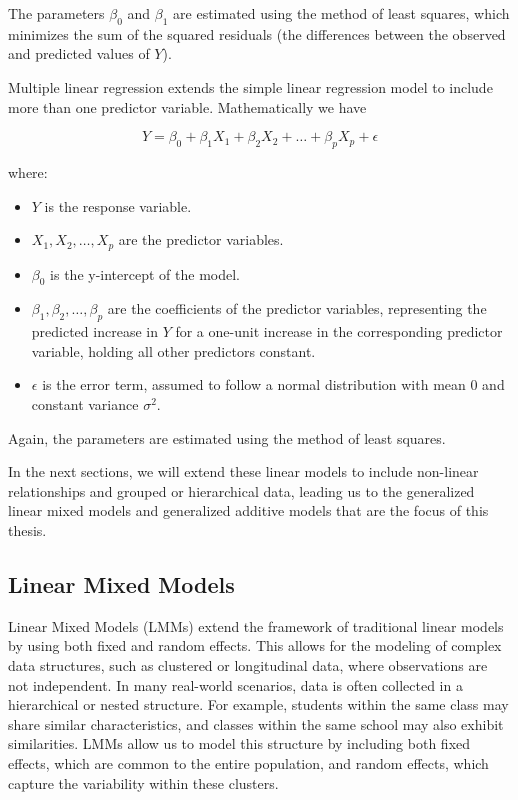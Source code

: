 \documentclass[12pt, twoside,hidelinks]{article}
\theoremstyle{definition}
\numberwithin{equation}{section}
\begin{document}
The parameters \(\beta_0\) and \(\beta_1\) are estimated using the method of least squares, which minimizes the sum of the squared residuals (the differences between the observed and predicted values of \(Y\)).
\newline

Multiple linear regression extends the simple linear regression model to include more than one predictor variable. Mathematically we have

\[ Y = \beta_0 + \beta_1X_1 + \beta_2X_2 + \ldots + \beta_pX_p + \epsilon \]

where:

\begin{itemize}
\item \(Y\) is the response variable.
\item \(X_1, X_2, \ldots, X_p\) are the predictor variables.
\item \(\beta_0\) is the y-intercept of the model.
\item \(\beta_1, \beta_2, \ldots, \beta_p\) are the coefficients of the predictor variables, representing the predicted increase in \(Y\) for a one-unit increase in the corresponding predictor variable, holding all other predictors constant.
\item \(\epsilon\) is the error term, assumed to follow a normal distribution with mean 0 and constant variance \(\sigma^2\).
\end{itemize}

Again, the parameters are estimated using the method of least squares.

In the next sections, we will extend these linear models to include non-linear relationships and grouped or hierarchical data, leading us to the generalized linear mixed models and generalized additive models that are the focus of this thesis.

\subsection{Linear Mixed Models}
Linear Mixed Models (LMMs) extend the framework of traditional linear models by using both fixed and random effects. This allows for the modeling of complex data structures, such as clustered or longitudinal data, where observations are not independent.
\newline 
In many real-world scenarios, data is often collected in a hierarchical or
nested structure. For example, students within the same class may share
similar characteristics, and classes within the same school may also exhibit
similarities. LMMs allow us to model this structure by including both fixed
effects, which are common to the entire population, and random effects, which
capture the variability within these clusters.
\newline
\end{document}
